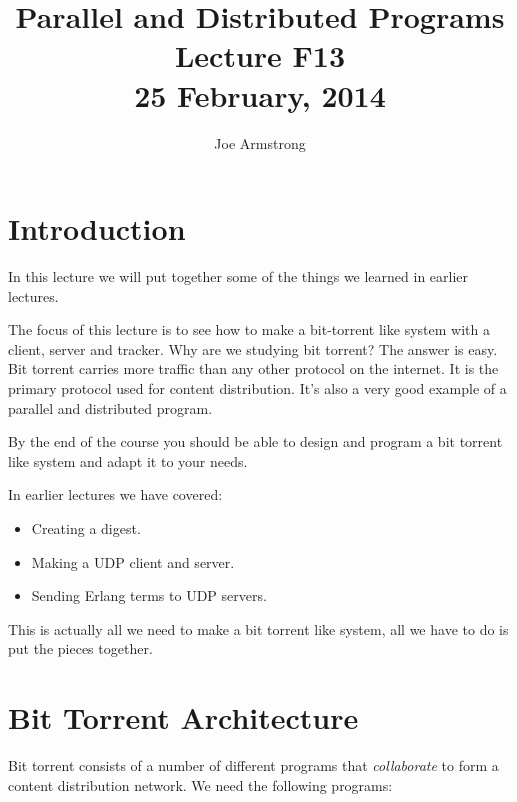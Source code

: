 \documentclass[10pt]{article}
\title{Parallel and Distributed Programs\\
Lecture F13\\
25 February, 2014
}
\author{Joe Armstrong}
\begin{document}
\maketitle

\tableofcontents

\section{Introduction}

In this lecture we will put together some of the things we learned in
earlier lectures.

The focus of this lecture is to see how to make a bit-torrent like
system with a client, server and tracker. Why are we studying bit
torrent? The answer is easy. Bit torrent carries more traffic than any
other protocol on the internet. It is the primary protocol used for
content distribution. It's also a very good example of a parallel and
distributed program.

By the end of the course you should be able to design and program a
bit torrent like system and adapt it to your needs.

In earlier lectures we have covered:

\begin{itemize}
\item Creating a digest.
\item Making a UDP client and server.
\item Sending Erlang terms to UDP servers.
\end{itemize}

This is actually all we need to make a bit torrent like system, all we have
to do is put the pieces together.

\section{Bit Torrent Architecture}

Bit torrent consists of a number of different programs that {\sl collaborate} to
form a content distribution network. We need the following programs:
\end{document}

